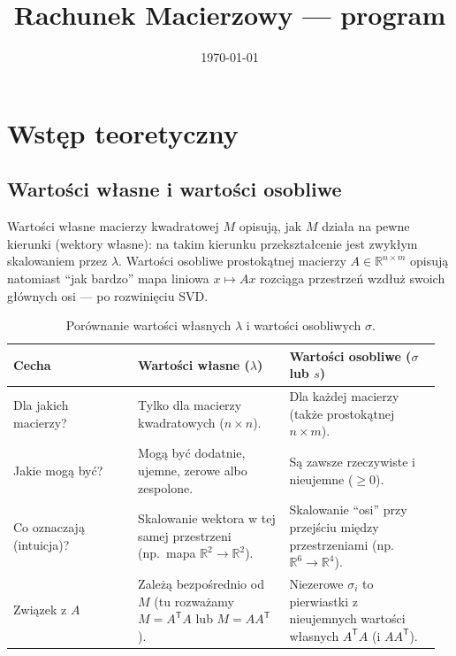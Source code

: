 \documentclass[polish]{template/projectreport}
\title{\TytulZadania\\{\large Rachunek Macierzowy --- program \NumerProgramu}}
\author{\Autorzy}
\date{\today}
\begin{document}
\maketitle


\section{Wstęp teoretyczny}\label{sec:wstep}

\subsection{Wartości własne i wartości osobliwe}
Wartości własne macierzy kwadratowej $M$ opisują, jak $M$ działa na pewne kierunki (wektory własne): na takim kierunku przekształcenie jest zwykłym skalowaniem przez $\lambda$.
Wartości osobliwe prostokątnej macierzy $A\in\mathbb{R}^{n\times m}$ opisują natomiast ``jak bardzo'' mapa liniowa $x\mapsto Ax$ rozciąga przestrzeń wzdłuż swoich głównych osi --- po rozwinięciu SVD.

\begin{table}[htbp]\centering\small
\caption{Porównanie wartości własnych $\lambda$ i wartości osobliwych $\sigma$.}
\begin{tabular}{@{}p{0.28\linewidth}p{0.34\linewidth}p{0.34\linewidth}@{}}\toprule
Cecha & Wartości własne ($\lambda$) & Wartości osobliwe ($\sigma$ lub $s$) \\ \midrule
Dla jakich macierzy? &
Tylko dla macierzy kwadratowych ($n\times n$). &
Dla każdej macierzy (także prostokątnej $n\times m$). \\
Jakie mogą być? &
Mogą być dodatnie, ujemne, zerowe albo zespolone. &
Są zawsze rzeczywiste i nieujemne ($\ge 0$). \\
Co oznaczają (intuicja)? &
Skalowanie wektora w tej samej przestrzeni (np.\ mapa $\mathbb{R}^2\to\mathbb{R}^2$). &
Skalowanie ``osi'' przy przejściu między przestrzeniami (np.\ $\mathbb{R}^6\to\mathbb{R}^4$). \\
Związek z $A$ &
Zależą bezpośrednio od $M$ (tu rozważamy $M=A^{\mathsf T}A$ lub $M=AA^{\mathsf T}$). &
Niezerowe $\sigma_i$ to pierwiastki z nieujemnych wartości własnych $A^{\mathsf T}A$ (i $AA^{\mathsf T}$). \\
\bottomrule
\end{tabular}
\end{table}
\end{document}

